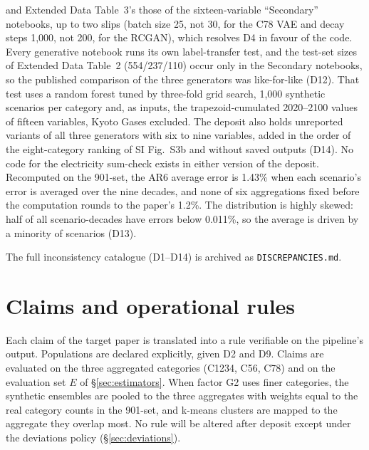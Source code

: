 \documentclass[11pt,a4paper]{article}
\newcommand{\prop}[1]{#1}
\newcommand{\prop}[1]{\textcolor{blue}{#1}}
\begin{document}
\begin{enumerate}[nosep]
{  and Extended Data Table~3's those of the sixteen-variable ``Secondary''
  notebooks, up to two slips (batch size 25, not 30, for the C78 VAE and
  decay steps 1{,}000, not 200, for the RCGAN), which resolves D4 in favour
  of the code. Every generative notebook runs its own label-transfer test,
  and the test-set sizes of Extended Data Table~2 (554/237/110) occur only
  in the Secondary notebooks, so the published comparison of the three
  generators was like-for-like (D12). That test uses a random forest tuned
  by three-fold grid search, 1{,}000 synthetic scenarios per category and,
  as inputs, the trapezoid-cumulated 2020--2100 values of fifteen variables,
  Kyoto Gases excluded. The deposit also holds unreported variants of all
  three generators with six to nine variables, added in the order of the
  eight-category ranking of SI Fig.~S3b and without saved outputs (D14). No
  code for the electricity sum-check exists in either version of the
  deposit. Recomputed on the 901-set, the AR6 average error is 1.43\% when
  each scenario's error is averaged over the nine decades, and none of six
  aggregations fixed before the computation rounds to the paper's 1.2\%. The
  distribution is highly skewed: half of all scenario-decades have errors
  below 0.011\%, so the average is driven by a minority of scenarios (D13).}
\end{enumerate}
The full inconsistency catalogue (D1--\prop{D14}) is archived as
\texttt{DISCREPANCIES.md}.

\section{Claims and operational rules}\label{sec:claims}
Each claim of the target paper is translated into a rule verifiable on the
pipeline's output. Populations are declared explicitly, given D2 and D9.
\prop{Claims are evaluated on the three aggregated categories (C1234, C56,
C78) and on the evaluation set $E$ of \S\ref{sec:estimators}. When factor G2
uses finer categories, the synthetic ensembles are pooled to the three
aggregates with weights equal to the real category counts in the 901-set,
and k-means clusters are mapped to the aggregate they overlap most.} No rule
will be altered after deposit except under the deviations policy
(\S\ref{sec:deviations}).
\end{document}
